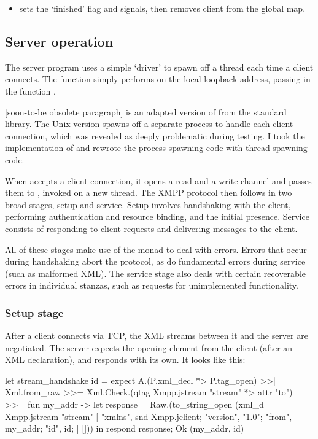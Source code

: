 \documentclass[12pt,a4paper,twoside,openright]{report}
\begin{document}
{\begin{itemize}
  \item {} sets the `finished' flag and signals, then removes client from the global map.
\end{itemize}

\subsection{Server operation}
The server program uses a simple `driver' to spawn off a thread each time a client connects. The function  simply performs  on the local loopback address, passing in the function .

[soon-to-be obsolete paragraph]
 is an adapted version of  from the standard library. The Unix version spawns off a separate process to handle each client connection, which was revealed as deeply problematic during testing. I took the implementation of  and rewrote the process-spawning code with thread-spawning code.

When  accepts a client connection, it opens a read and a write channel and passes them to , invoked on a new thread. The XMPP protocol then follows in two broad stages, setup and service. Setup involves handshaking with the client, performing authentication and resource binding, and the initial presence. Service consists of responding to client requests and delivering messages to the client.

All of these stages make use of the  monad to deal with errors. Errors that occur during handshaking abort the protocol, as do fundamental errors during service (such as malformed XML). The service stage also deals with certain recoverable errors in individual stanzas, such as requests for unimplemented functionality.

\subsubsection{Setup stage}
After a client connects via TCP, the XML streams between it and the server are negotiated. The server expects the  opening element from the client (after an XML declaration), and responds with its own. It looks like this:

\begin{ocaml}
let stream_handshake id =
  expect A.(P.xml_decl *> P.tag_open) >>| Xml.from_raw >>=
    Xml.Check.(qtag Xmpp.jstream "stream" *> attr "to") >>= fun my_addr ->
  let response = Raw.(to_string_open (xml_d Xmpp.jstream "stream" [
    "xmlns", snd Xmpp.jclient;
    "version", "1.0"; "from", my_addr; "id", id;
  ] []))
  in respond response; Ok (my_addr, id)
\end{ocaml}

}
\end{document}
